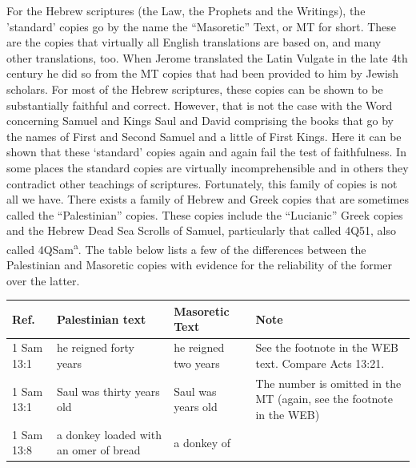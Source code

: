 {For the Hebrew scriptures (the Law, the Prophets and the Writings), the 'standard' copies go by the name the ``Masoretic'' Text, or MT for short. These are the copies that virtually all English translations are based on, and many other translations, too. When Jerome translated the Latin Vulgate in the late 4th century he did so from the MT copies that had been provided to him by Jewish scholars. For most of the Hebrew scriptures, these copies can be shown to be substantially faithful and correct. However, that is not the case with the Word concerning
Samuel and Kings Saul and David comprising the books that go by the names of First and Second Samuel and a little of First Kings. Here it can be shown that these
`standard' copies again and again fail the test of faithfulness. In some places the standard copies are virtually incomprehensible and in others they contradict other teachings of scriptures.
Fortunately, this family of copies is not all we have. There exists a
family of Hebrew and Greek copies that are sometimes called the
``Palestinian'' copies. These copies include the ``Lucianic'' Greek copies and the
Hebrew Dead Sea Scrolls of Samuel, particularly that called 4Q51, also
called 4QSam\textsuperscript{a}. The table below lists a few of the
differences between the Palestinian and Masoretic copies with evidence
for the reliability of the former over the latter.
\begin{tabular}{p{}p{}p{}p{}}\hline
  Ref.& Palestinian text& Masoretic Text&Note\\\hline
  1 Sam 13:1&he reigned forty years&he reigned two years&See the
                                                          footnote in
                                                          the WEB
                                                          text. Compare
                                                          Acts
                                                          13:21.\\
  1 Sam 13:1&Saul was thirty years old&Saul was years old&The number
                                                           is omitted
                                                           in the MT
                                                           (again, see
                                                           the
                                                           footnote in
                                                           the WEB)\\
  1 Sam 13:8&a donkey loaded with an omer of bread&a donkey of

\end{tabular}}
